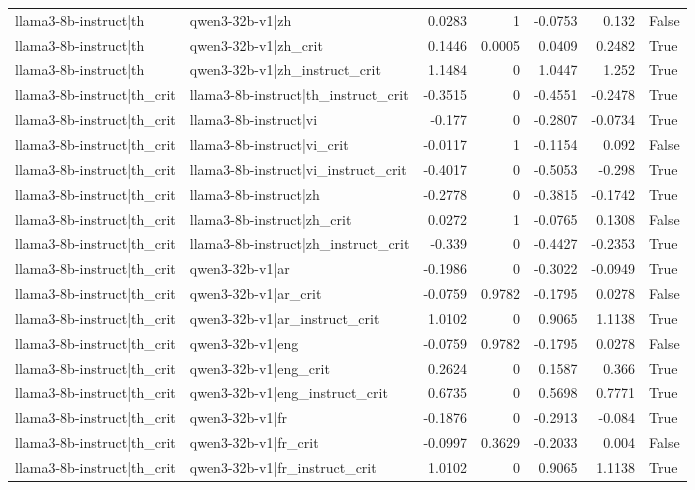 \begin{table}
\begin{tabular}{l l r r r r l}
llama3-8b-instruct|th & qwen3-32b-v1|zh & 0.0283 & 1 & -0.0753 & 0.132 & False \\
llama3-8b-instruct|th & qwen3-32b-v1|zh_crit & 0.1446 & 0.0005 & 0.0409 & 0.2482 & True \\
llama3-8b-instruct|th & qwen3-32b-v1|zh_instruct_crit & 1.1484 & 0 & 1.0447 & 1.252 & True \\
llama3-8b-instruct|th_crit & llama3-8b-instruct|th_instruct_crit & -0.3515 & 0 & -0.4551 & -0.2478 & True \\
llama3-8b-instruct|th_crit & llama3-8b-instruct|vi & -0.177 & 0 & -0.2807 & -0.0734 & True \\
llama3-8b-instruct|th_crit & llama3-8b-instruct|vi_crit & -0.0117 & 1 & -0.1154 & 0.092 & False \\
llama3-8b-instruct|th_crit & llama3-8b-instruct|vi_instruct_crit & -0.4017 & 0 & -0.5053 & -0.298 & True \\
llama3-8b-instruct|th_crit & llama3-8b-instruct|zh & -0.2778 & 0 & -0.3815 & -0.1742 & True \\
llama3-8b-instruct|th_crit & llama3-8b-instruct|zh_crit & 0.0272 & 1 & -0.0765 & 0.1308 & False \\
llama3-8b-instruct|th_crit & llama3-8b-instruct|zh_instruct_crit & -0.339 & 0 & -0.4427 & -0.2353 & True \\
llama3-8b-instruct|th_crit & qwen3-32b-v1|ar & -0.1986 & 0 & -0.3022 & -0.0949 & True \\
llama3-8b-instruct|th_crit & qwen3-32b-v1|ar_crit & -0.0759 & 0.9782 & -0.1795 & 0.0278 & False \\
llama3-8b-instruct|th_crit & qwen3-32b-v1|ar_instruct_crit & 1.0102 & 0 & 0.9065 & 1.1138 & True \\
llama3-8b-instruct|th_crit & qwen3-32b-v1|eng & -0.0759 & 0.9782 & -0.1795 & 0.0278 & False \\
llama3-8b-instruct|th_crit & qwen3-32b-v1|eng_crit & 0.2624 & 0 & 0.1587 & 0.366 & True \\
llama3-8b-instruct|th_crit & qwen3-32b-v1|eng_instruct_crit & 0.6735 & 0 & 0.5698 & 0.7771 & True \\
llama3-8b-instruct|th_crit & qwen3-32b-v1|fr & -0.1876 & 0 & -0.2913 & -0.084 & True \\
llama3-8b-instruct|th_crit & qwen3-32b-v1|fr_crit & -0.0997 & 0.3629 & -0.2033 & 0.004 & False \\
llama3-8b-instruct|th_crit & qwen3-32b-v1|fr_instruct_crit & 1.0102 & 0 & 0.9065 & 1.1138 & True \\

\end{tabular}
\end{table}
